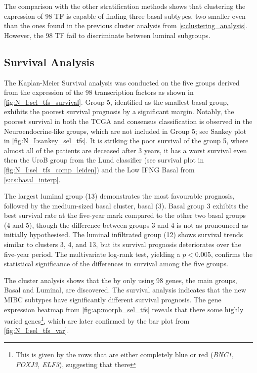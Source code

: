 The comparison with the other stratification methods shows that clustering the expression of 98 TF is capable of finding three basal subtypes, two smaller even than the ones found in the previous cluster analysis from \cref{s:clustering_analysis}. However, the 98 TF fail to discriminate between luminal subgroups.

\subsection{Survival Analysis}

The Kaplan-Meier Survival analysis was conducted on the five groups derived from the expression of the 98 transcription factors as shown in \cref{fig:N_I:sel_tfs_survival}. Group 5, identified as the smallest basal group, exhibits the poorest survival prognosis by a significant margin. Notably, the poorest survival in both the TCGA and consensus classification is observed in the Neuroendocrine-like groups, which are not included in Group 5; see Sankey plot in \cref{fig:N_I:sankey_sel_tfs}. It is striking the poor survival of the group 5, where almost all of the patients are deceased after 3 years, it has a worst survival even then the UroB group from the Lund classifier (see survival plot in \cref{fig:N_I:sel_tfs_comp_leiden}) and the Low IFNG Basal from \cref{s:cs:basal_interp}.

The largest luminal group (13) demonstrates the most favourable prognosis, followed by the medium-sized basal cluster, basal (3). Basal group 3 exhibits the best survival rate at the five-year mark compared to the other two basal groups (4 and 5), though the difference between groups 3 and 4 is not as pronounced as initially hypothesised. The luminal infiltrated group (12) shows survival trends similar to clusters 3, 4, and 13, but its survival prognosis deteriorates over the five-year period. The multivariate log-rank test, yielding a $p<0.005$, confirms the statistical significance of the differences in survival among the five groups.


The cluster analysis shows that the by only using 98 genes, the main groups, Basal and Luminal, are discovered. The survival analysis indicates that the new MIBC subtypes have significantly different survival prognosis. The gene expression heatmap from \cref{fig:ap:morph_sel_tfs} reveals that there some highly varied genes\footnote{This is given by the rows that are either completely blue or red (\textit{BNC1, FOXJ3, ELF3}), suggesting that there }, which are later confirmed by the bar plot from \cref{fig:N_I:sel_tfs_var}. 


